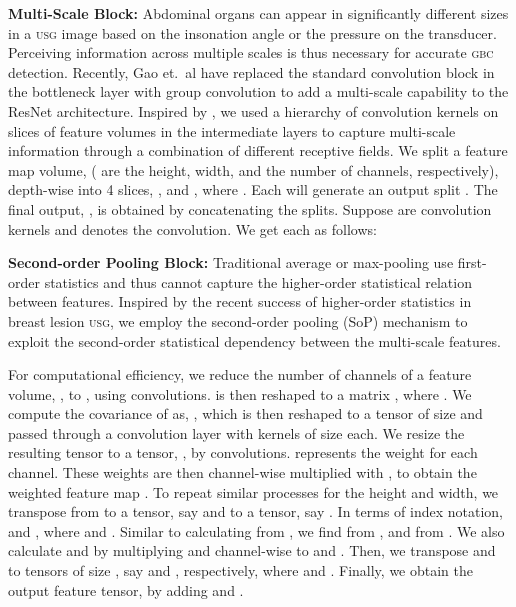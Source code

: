\documentclass[10pt,twocolumn,letterpaper]{article}
\def\etal{{et.~al}}
\def\usg{\textsc{usg}\xspace}
\def\gbc{\textsc{gbc}\xspace}
\newcommand{\myfirstpara}[1]{\noindent \textbf{#1:}}
\newcommand{\mypara}[1]{\vspace{0.1em} \myfirstpara{#1}}
\begin{document}
 \myfirstpara{Multi-Scale Block}
Abdominal organs can appear in significantly different sizes in a \usg image based on the insonation angle or the pressure on the transducer. Perceiving information across multiple scales is thus necessary for accurate \gbc detection. Recently, Gao \etal \cite{res2net} have replaced the standard convolution block in the bottleneck layer with group convolution to add a multi-scale capability to the ResNet architecture. Inspired by \cite{res2net}, we used a hierarchy of convolution kernels on slices of feature volumes in the intermediate layers to capture multi-scale information through a combination of different receptive fields. We split a feature map volume,  ( are the height, width, and the number of channels, respectively), depth-wise into 4 slices, , and , where . Each  will generate an output split . The final output, , is obtained by concatenating the splits. Suppose  are  convolution kernels and  denotes the convolution. We get each  as follows:
\linebreak
\begin{minipage}{.4\linewidth}
\vspace{-1em}

\end{minipage}
\begin{minipage}{.6\linewidth}
\vspace{-1em}

\end{minipage}

\mypara{Second-order Pooling Block}
Traditional average or max-pooling use first-order statistics and thus cannot capture the higher-order statistical relation between features. Inspired by the recent success of higher-order statistics in breast lesion \usg \cite{ning2020multi, zhu2020second}, we employ the second-order pooling (SoP) mechanism to exploit the second-order statistical dependency between the multi-scale features.  

For computational efficiency, we reduce the number of channels of a feature volume, , to , using  convolutions.  is then reshaped to a matrix , where . We compute the covariance of  as, , which is then reshaped to a tensor of size  and passed through a convolution layer with  kernels of size  each. We resize the resulting  tensor to a  tensor, , by  convolutions.  represents the weight for each channel. These weights are then channel-wise multiplied with , to obtain the weighted feature map . To repeat similar processes for the height and width, we transpose  from to a  tensor, say  and to a  tensor, say . In terms of index notation,  and , where  and . Similar to calculating  from , we find  from , and  from . We also calculate  and  by multiplying  and  channel-wise to  and . Then, we transpose  and  to tensors of size , say  and , respectively, where  and . Finally, we obtain the output feature tensor,  by adding  and . 
\vspace{-0.5em}
\end{document}
